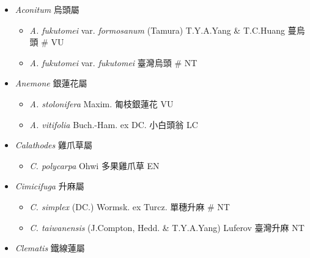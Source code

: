 
  \begin{itemize}
 \item[] \textit{Aconitum} 烏頭屬
                                
  \begin{itemize}
        \item[] \textit{A. fukutomei} var. \textit{formosanum} (Tamura) T.Y.A.Yang \& T.C.Huang  蔓烏頭  \# VU
        \item[] \textit{A. fukutomei} var. \textit{fukutomei}   臺灣烏頭  \# NT
  \end{itemize}
 \item[] \textit{Anemone} 銀蓮花屬
                                
  \begin{itemize}
        \item[] \textit{A. stolonifera} Maxim.  匍枝銀蓮花   VU
        \item[] \textit{A. vitifolia} Buch.-Ham. ex DC.  小白頭翁   LC
  \end{itemize}
 \item[] \textit{Calathodes} 雞爪草屬
                                
  \begin{itemize}
        \item[] \textit{C. polycarpa} Ohwi  多果雞爪草   EN
  \end{itemize}
 \item[] \textit{Cimicifuga} 升麻屬
                                
  \begin{itemize}
        \item[] \textit{C. simplex} (DC.) Wormsk. ex Turcz.  單穗升麻  \# NT
        \item[] \textit{C. taiwanensis} (J.Compton, Hedd. \& T.Y.A.Yang) Luferov  臺灣升麻   NT
  \end{itemize}
 \item[] \textit{Clematis} 鐵線蓮屬
                                

\end{itemize}
